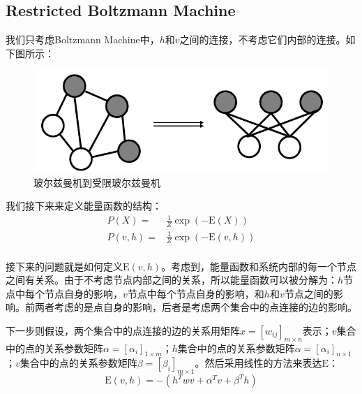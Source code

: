 \documentclass[a4paper]{article}
\begin{document}
\subsection{Restricted Boltzmann Machine}
我们只考虑Boltzmann Machine中，$h$和$v$之间的连接，不考虑它们内部的连接。如下图所示：
\begin{figure}[H]
    \centering
    \includegraphics[width=.6\textwidth]{微信图片_20200229000824.png}
    \caption{玻尔兹曼机到受限玻尔兹曼机}
    \label{fig:my_label_1}
\end{figure}

我们接下来来定义能量函数的结构：
\begin{equation}
    \begin{split}
        P(X) 
        = & \frac{1}{Z} \exp (-\mathrm{E}(X)) \\
        P(v,h) 
        = &  \frac{1}{Z} \exp (-\mathrm{E}(v,h)) \\
    \end{split}
\end{equation}

接下来的问题就是如何定义$\mathrm{E}(v,h)$。考虑到，能量函数和系统内部的每一个节点之间有关系。由于不考虑节点内部之间的关系，所以能量函数可以被分解为：$h$节点中每个节点自身的影响，$v$节点中每个节点自身的影响，和$h$和$v$节点之间的影响。前两者考虑的是点自身的影响，后者是考虑两个集合中的点连接的边的影响。

下一步则假设，两个集合中的点连接的边的关系用矩阵$x=[w_{ij}]_{m\times n}$表示；$v$集合中的点的关系参数矩阵$\alpha=[\alpha_i]_{1\times m}$；$h$集合中的点的关系参数矩阵$\alpha=[\alpha_i]_{n\times 1}$；$v$集合中的点的关系参数矩阵$\beta=[\beta_i]_{m\times 1}$。然后采用线性的方法来表达$\mathrm{E}$：
\begin{equation}
    \mathrm{E}(v,h) = - (h^T w v + \alpha^T v + \beta^T h)
\end{equation}
\end{document}
